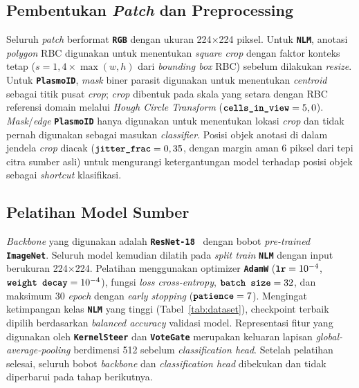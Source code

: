 \documentclass[conference]{IEEEtran}
\newcommand{\nama}[1]{\textbf{\texttt{#1}}}
\begin{document}
\subsection{Pembentukan \textit{Patch} dan Preprocessing}
Seluruh \textit{patch} berformat \nama{RGB} dengan ukuran 224$\times$224 piksel. Untuk \nama{NLM}, anotasi \textit{polygon} RBC digunakan untuk menentukan \textit{square crop} dengan faktor konteks tetap ($s=1{,}4\times\max(w,h)$ dari \textit{bounding box} RBC) sebelum dilakukan \textit{resize}. Untuk \nama{PlasmoID}, \textit{mask} biner parasit digunakan untuk menentukan \textit{centroid} sebagai titik pusat \textit{crop}; \textit{crop} dibentuk pada skala yang setara dengan RBC referensi domain melalui \textit{Hough Circle Transform} ($\text{\nama{cells\_in\_view}}=5,0$). \textit{Mask}/\textit{edge} \nama{PlasmoID} hanya digunakan untuk menentukan lokasi \textit{crop} dan tidak pernah digunakan sebagai masukan \textit{classifier}.
Posisi objek anotasi di dalam jendela \textit{crop} diacak ($\text{\nama{jitter\_frac}}=0,35$, dengan margin aman 6 piksel dari tepi citra sumber asli) untuk mengurangi ketergantungan model terhadap posisi objek sebagai \textit{shortcut} klasifikasi.

\subsection{Pelatihan Model Sumber}
\label{sec:pelatihan-model-sumber}
\textit{Backbone} yang digunakan adalah \nama{ResNet-18}~\cite{b23} dengan bobot \textit{pre-trained} \nama{ImageNet}. Seluruh model kemudian dilatih pada \textit{split train} \nama{NLM} dengan input berukuran 224$\times$224. Pelatihan menggunakan optimizer \nama{AdamW} ($\nama{lr}=10^{-4}$, $\nama{weight decay}=10^{-4}$), fungsi \textit{loss cross-entropy}, $\nama{batch size}=32$, dan maksimum 30 \textit{epoch} dengan \textit{early stopping} ($\nama{patience}=7$). Mengingat ketimpangan kelas \nama{NLM} yang tinggi (Tabel~\ref{tab:dataset}), checkpoint terbaik dipilih berdasarkan \textit{balanced accuracy} validasi model. Representasi fitur yang digunakan oleh \nama{KernelSteer} dan \nama{VoteGate} merupakan keluaran lapisan \textit{global-average-pooling} berdimensi 512 sebelum \textit{classification head}. Setelah pelatihan selesai, seluruh bobot \textit{backbone} dan \textit{classification head} dibekukan dan tidak diperbarui pada tahap berikutnya.
\end{document}
